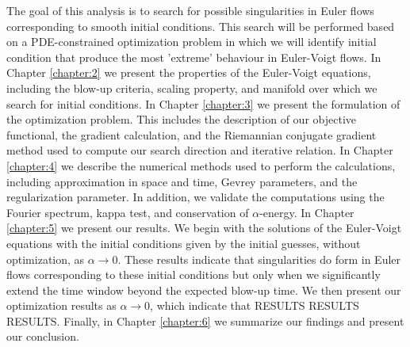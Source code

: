 The goal of this analysis is to search for possible singularities in Euler flows corresponding to smooth initial conditions. This search will be performed based on a PDE-constrained optimization problem in which we will identify initial condition that produce the most 'extreme' behaviour in Euler-Voigt flows. In Chapter \ref{chapter:2} we present the properties of the Euler-Voigt equations, including the blow-up criteria, scaling property, and manifold over which we search for initial conditions. In Chapter \ref{chapter:3} we present the formulation of the optimization problem. This includes the description of our objective functional, the gradient calculation, and the Riemannian conjugate gradient method used to compute our search direction and iterative relation. In Chapter \ref{chapter:4} we describe the numerical methods used to perform the calculations, including approximation in space and time, Gevrey parameters, and the regularization parameter. In addition, we validate the computations using the Fourier spectrum, kappa test, and conservation of $\alpha$-energy. In Chapter \ref{chapter:5} we present our results. We begin with the solutions of the Euler-Voigt equations {\color{red}with the initial conditions given by the initial guesses, without optimization, as $\alpha\rightarrow 0$. These results indicate that singularities do  form in Euler flows corresponding to these initial conditions but only when we significantly extend the time window beyond the expected blow-up time}. We then present our optimization results as $\alpha\rightarrow 0$, which indicate that RESULTS RESULTS RESULTS. Finally, in Chapter \ref{chapter:6} we summarize our findings and present our conclusion.

